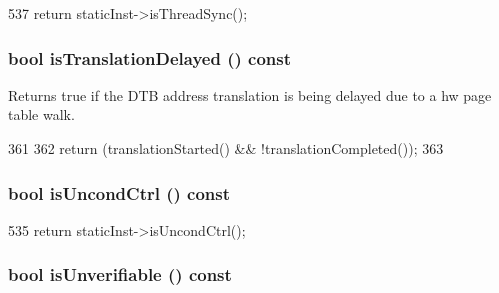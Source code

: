 \begin{DoxyCode}
537 { return staticInst->isThreadSync(); }
\end{DoxyCode}
\hypertarget{classBaseDynInst_a7fd0fd6367bf06758cdba245730318a4}{
\subsubsection[{isTranslationDelayed}]{\setlength{\rightskip}{0pt plus 5cm}bool isTranslationDelayed () const}}
\label{classBaseDynInst_a7fd0fd6367bf06758cdba245730318a4}
Returns true if the DTB address translation is being delayed due to a hw page table walk. 


\begin{DoxyCode}
361     {
362         return (translationStarted() && !translationCompleted());
363     }
\end{DoxyCode}
\hypertarget{classBaseDynInst_af53002b2f11733681e8552aa6805a706}{
\subsubsection[{isUncondCtrl}]{\setlength{\rightskip}{0pt plus 5cm}bool isUncondCtrl () const}}
\label{classBaseDynInst_af53002b2f11733681e8552aa6805a706}



\begin{DoxyCode}
535 { return staticInst->isUncondCtrl(); }
\end{DoxyCode}
\hypertarget{classBaseDynInst_ae9cbcc655cf8d63153d0c3f8bbf59841}{
\subsubsection[{isUnverifiable}]{\setlength{\rightskip}{0pt plus 5cm}bool isUnverifiable () const}}
\label{classBaseDynInst_ae9cbcc655cf8d63153d0c3f8bbf59841}



